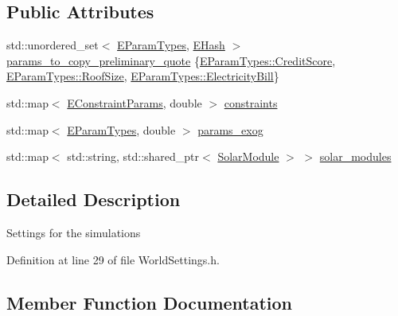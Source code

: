 \subsection*{Public Attributes}
{\bf }\par
\begin{DoxyCompactItemize}
\item 
std\+::unordered\+\_\+set$<$ \hyperlink{namespacesolar__core_aa1147341e5ef7a40d68d1bd68e149362}{E\+Param\+Types}, \hyperlink{structsolar__core_1_1_world_settings_1_1_e_hash}{E\+Hash} $>$ \hyperlink{classsolar__core_1_1_world_settings_a728f0b1c11f8ec1816d269aedc1cd80e}{params\+\_\+to\+\_\+copy\+\_\+preliminary\+\_\+quote} \{\hyperlink{namespacesolar__core_aa1147341e5ef7a40d68d1bd68e149362a417bef7b89fce8abf638b9983a79a70e}{E\+Param\+Types\+::\+Credit\+Score}, \hyperlink{namespacesolar__core_aa1147341e5ef7a40d68d1bd68e149362a2bf6593af19bb602f7c596d7327c6dd6}{E\+Param\+Types\+::\+Roof\+Size}, \hyperlink{namespacesolar__core_aa1147341e5ef7a40d68d1bd68e149362a9b8cd62150c419c61129f736404b0579}{E\+Param\+Types\+::\+Electricity\+Bill}\}
\item 
std\+::map$<$ \hyperlink{namespacesolar__core_ac827fdef4412a3c0d5e44d3f31908e49}{E\+Constraint\+Params}, double $>$ \hyperlink{classsolar__core_1_1_world_settings_ab9108a4169d6508f8e03f0298088ac69}{constraints}
\item 
std\+::map$<$ \hyperlink{namespacesolar__core_aa1147341e5ef7a40d68d1bd68e149362}{E\+Param\+Types}, double $>$ \hyperlink{classsolar__core_1_1_world_settings_a2bf0de816c9c0b51e01e88b8ff0f779e}{params\+\_\+exog}
\item 
std\+::map$<$ std\+::string, std\+::shared\+\_\+ptr$<$ \hyperlink{classsolar__core_1_1_solar_module}{Solar\+Module} $>$ $>$ \hyperlink{classsolar__core_1_1_world_settings_acb33be8576dd4f60836373ea1b573fe6}{solar\+\_\+modules}
\end{DoxyCompactItemize}



\subsection{Detailed Description}
Settings for the simulations 

Definition at line 29 of file World\+Settings.\+h.



\subsection{Member Function Documentation}
\hypertarget{classsolar__core_1_1_world_settings_a719e11b52a0e087f8c0dd11d9f65da88}{}
